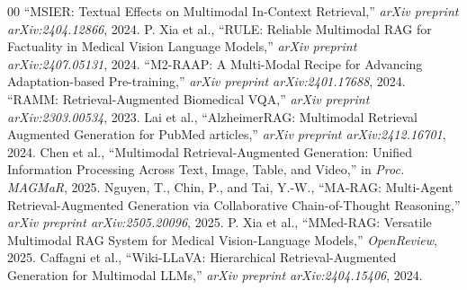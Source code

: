 \documentclass[conference]{IEEEtran}
\begin{document}
\begin{thebibliography}{00}
``MSIER: Textual Effects on Multimodal In-Context Retrieval,'' \textit{arXiv preprint arXiv:2404.12866}, 2024.
P. Xia et al., ``RULE: Reliable Multimodal RAG for Factuality in Medical Vision Language Models,'' \textit{arXiv preprint arXiv:2407.05131}, 2024.
``M2-RAAP: A Multi-Modal Recipe for Advancing Adaptation-based Pre-training,'' \textit{arXiv preprint arXiv:2401.17688}, 2024.
``RAMM: Retrieval-Augmented Biomedical VQA,'' \textit{arXiv preprint arXiv:2303.00534}, 2023.
Lai et al., ``AlzheimerRAG: Multimodal Retrieval Augmented Generation for PubMed articles,'' \textit{arXiv preprint arXiv:2412.16701}, 2024.
Chen et al., ``Multimodal Retrieval-Augmented Generation: Unified Information Processing Across Text, Image, Table, and Video,'' in \textit{Proc. MAGMaR}, 2025.
Nguyen, T., Chin, P., and Tai, Y.-W., ``MA-RAG: Multi-Agent Retrieval-Augmented Generation via Collaborative Chain-of-Thought Reasoning,'' \textit{arXiv preprint arXiv:2505.20096}, 2025.
P. Xia et al., ``MMed-RAG: Versatile Multimodal RAG System for Medical Vision-Language Models,'' \textit{OpenReview}, 2025.
Caffagni et al., ``Wiki-LLaVA: Hierarchical Retrieval-Augmented Generation for Multimodal LLMs,'' \textit{arXiv preprint arXiv:2404.15406}, 2024.
\end{thebibliography}
\end{document}
